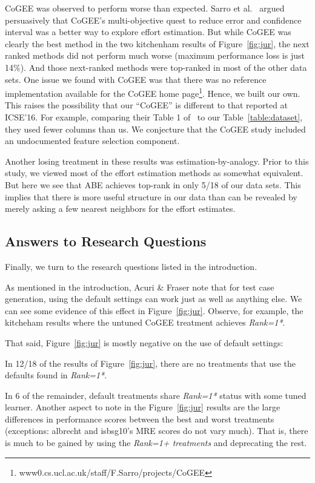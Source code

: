 CoGEE was observed to perform worse than expected. Sarro et al.~\cite{sarro2016multi} argued persuasively that CoGEE's
 multi-objective quest to reduce error and confidence interval was a better way to explore effort estimation. But while CoGEE was clearly the best method in the two kitchenham results of
 Figure~\ref{fig:jur}, the next ranked methods did not perform much worse (maximum performance loss is just 14\%). And those next-ranked methods were top-ranked in most of the other data sets. 
One issue we found with CoGEE was that there was no reference implementation 
available for the CoGEE   home page\footnote{www0.cs.ucl.ac.uk/staff/F.Sarro/projects/CoGEE}. Hence, we   built our own. This  
raises the possibility that our ``CoGEE'' is different to that reported at ICSE'16. For example, comparing their Table 1 of~\cite{sarro2016multi} to our Table~\ref{table:dataset}, 
they used fewer columns than us.
We conjecture that the CoGEE study included an undocumented feature selection component. 

Another losing treatment in these results was estimation-by-analogy. Prior to
this study, we viewed most of the effort estimation methods as somewhat equivalent.
But here we see that ABE achieves top-rank in only 5/18 of our data sets.  This implies that there is more useful structure in our  data than can be revealed
by merely asking a few nearest neighbors for the effort estimates.

\subsection{Answers to Research Questions}

Finally, we turn to the research questions listed in the introduction.

 
 As mentioned in the introduction, 
 Acuri \& Fraser note that for
 test case generation,   using the default settings
can work just as well as anything else. 
 We can see some evidence of this effect in  Figure~\ref{fig:jur}. Observe, for example, the
  kitcheham results where the untuned CoGEE treatment achieves {\em Rank=1*}.  
  
  That said,  Figure~\ref{fig:jur} is mostly negative on the use of default settings:
 \bi
 \item
In   12/18 of the results  of Figure~\ref{fig:jur}, there are
no   treatments that use the defaults found in  {\em Rank=1*}. 
 \item
 In 6  of the remainder, default
 treatments share {\em Rank=1*} status with some tuned learner. 
 \ei
 Another aspect to note in the Figure~\ref{fig:jur} results
 are the large differences in performance scores
 between the best and worst treatments (exceptions: albrecht and  isbsg10's MRE scores do not vary much). That is, there is much to be gained by using the {\em Rank=1+ treatments} and deprecating the rest.
 
